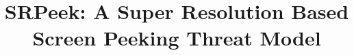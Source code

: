 \documentclass[10pt, conference, letterpaper]{IEEEtran}
\begin{document}
\title{SRPeek: A Super Resolution Based Screen Peeking Threat Model}




\maketitle




















\end{document}

